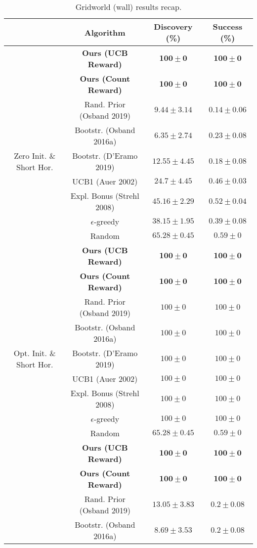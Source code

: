 \documentclass{article}
\begin{document}
\begin{table}[h]
\centering
\caption{Gridworld (wall) results recap.}
\begin{tabular}{ c | c | c c }
 & Algorithm & Discovery (\%) & Success (\%) \\
 \hline
 & \textbf{Ours (UCB Reward)} & $\mathbf{100 \pm 0}$ & $\mathbf{100 \pm 0}$ \\
 & \textbf{Ours (Count Reward)} & $\mathbf{100 \pm 0}$ & $\mathbf{100 \pm 0}$ \\
 & Rand. Prior (Osband 2019) & $9.44 \pm 3.14$ & $0.14 \pm 0.06$ \\
 & Bootstr. (Osband 2016a) & $6.35 \pm 2.74$ & $0.23 \pm 0.08$ \\
 Zero Init. \& Short Hor. & Bootstr. (D'Eramo 2019) & $12.55 \pm 4.45$ & $0.18 \pm 0.08$ \\
 & UCB1 (Auer 2002) & $24.7 \pm 4.45$ & $0.46 \pm 0.03$ \\
 & Expl. Bonus (Strehl 2008) & $45.16 \pm 2.29$ & $0.52 \pm 0.04$ \\
 & $\epsilon$-greedy & $38.15 \pm 1.95$ & $0.39 \pm 0.08$ \\
 & Random & $65.28 \pm 0.45$ & $0.59 \pm 0$ \\
 \hline
 & \textbf{Ours (UCB Reward)} & $\mathbf{100 \pm 0}$ & $\mathbf{100 \pm 0}$ \\
 & \textbf{Ours (Count Reward)} & $\mathbf{100 \pm 0}$ & $\mathbf{100 \pm 0}$ \\
 & Rand. Prior (Osband 2019) & $100 \pm 0$ & $100 \pm 0$ \\
 & Bootstr. (Osband 2016a) & $100 \pm 0$ & $100 \pm 0$ \\
 Opt. Init. \& Short Hor. & Bootstr. (D'Eramo 2019) & $100 \pm 0$ & $100 \pm 0$ \\
 & UCB1 (Auer 2002) & $100 \pm 0$ & $100 \pm 0$ \\
 & Expl. Bonus (Strehl 2008) & $100 \pm 0$ & $100 \pm 0$ \\
 & $\epsilon$-greedy & $100 \pm 0$ & $100 \pm 0$ \\
 & Random & $65.28 \pm 0.45$ & $0.59 \pm 0$ \\
 \hline
 & \textbf{Ours (UCB Reward)} & $\mathbf{100 \pm 0}$ & $\mathbf{100 \pm 0}$ \\
 & \textbf{Ours (Count Reward)} & $\mathbf{100 \pm 0}$ & $\mathbf{100 \pm 0}$ \\
 & Rand. Prior (Osband 2019) & $13.05 \pm 3.83$ & $0.2 \pm 0.08$ \\
 & Bootstr. (Osband 2016a) & $8.69 \pm 3.53$ & $0.2 \pm 0.08$ \\

\end{tabular}
\end{table}
\end{document}
